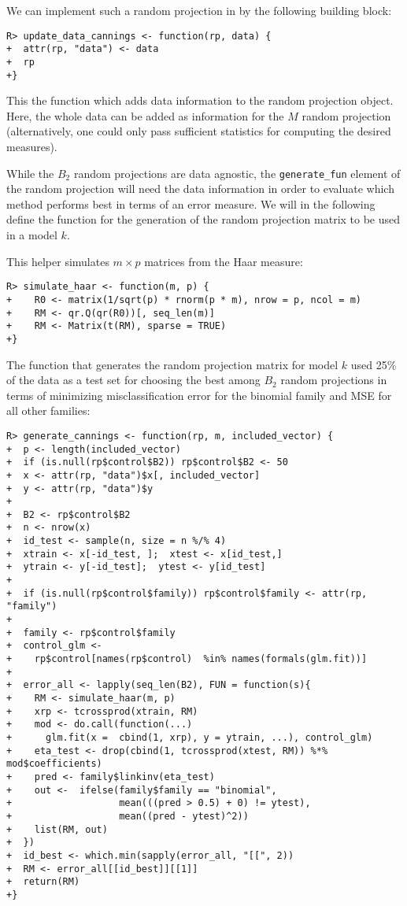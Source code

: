 \documentclass[
  article]{jss}
\begin{document}
We can implement such a random projection in  by the following
building block:

\begin{verbatim}
R> update_data_cannings <- function(rp, data) {
+  attr(rp, "data") <- data
+  rp
+}
\end{verbatim}

This the function which adds data information to the random projection
object. Here, the whole data can be added as information for the \(M\)
random projection (alternatively, one could only pass sufficient
statistics for computing the desired measures).

While the \(B_2\) random projections are data agnostic, the
\texttt{generate\_fun} element of the random projection will need the
data information in order to evaluate which method performs best in
terms of an error measure. We will in the following define the function
for the generation of the random projection matrix to be used in a model
\(k\).

This helper simulates \(m\times p\) matrices from the Haar measure:

\begin{verbatim}
R> simulate_haar <- function(m, p) {
+    R0 <- matrix(1/sqrt(p) * rnorm(p * m), nrow = p, ncol = m)
+    RM <- qr.Q(qr(R0))[, seq_len(m)]
+    RM <- Matrix(t(RM), sparse = TRUE)  
+}
\end{verbatim}

The function that generates the random projection matrix for model \(k\)
used 25\% of the data as a test set for choosing the best among \(B_2\)
random projections in terms of minimizing misclassification error for
the binomial family and MSE for all other families:

\begin{verbatim}
R> generate_cannings <- function(rp, m, included_vector) {
+  p <- length(included_vector)
+  if (is.null(rp$control$B2)) rp$control$B2 <- 50
+  x <- attr(rp, "data")$x[, included_vector]
+  y <- attr(rp, "data")$y
+  
+  B2 <- rp$control$B2
+  n <- nrow(x)
+  id_test <- sample(n, size = n %/% 4)
+  xtrain <- x[-id_test, ];  xtest <- x[id_test,]
+  ytrain <- y[-id_test];  ytest <- y[id_test]
+  
+  if (is.null(rp$control$family)) rp$control$family <- attr(rp, "family")
+  
+  family <- rp$control$family
+  control_glm <-
+    rp$control[names(rp$control)  %in% names(formals(glm.fit))]
+
+  error_all <- lapply(seq_len(B2), FUN = function(s){
+    RM <- simulate_haar(m, p)
+    xrp <- tcrossprod(xtrain, RM)
+    mod <- do.call(function(...) 
+      glm.fit(x =  cbind(1, xrp), y = ytrain, ...), control_glm)
+    eta_test <- drop(cbind(1, tcrossprod(xtest, RM)) %*% mod$coefficients)
+    pred <- family$linkinv(eta_test)
+    out <-  ifelse(family$family == "binomial",
+                   mean(((pred > 0.5) + 0) != ytest), 
+                   mean((pred - ytest)^2))
+    list(RM, out)
+  })
+  id_best <- which.min(sapply(error_all, "[[", 2))
+  RM <- error_all[[id_best]][[1]]
+  return(RM)
+}
\end{verbatim}
\end{document}
